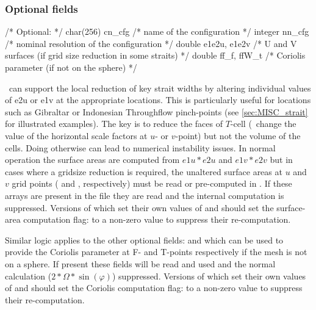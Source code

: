 \documentclass[../main/NEMO_manual]{subfiles}
\begin{document}
\subsubsection{Optional fields}

\begin{forlines}
                        /* Optional:                                                 */
char(256) cn_cfg        /* name of the configuration                                 */
integer   nn_cfg        /* nominal resolution of the configuration                   */
double e1e2u, e1e2v     /* U and V surfaces (if grid size reduction in some straits) */
double ff_f, ffW_t      /* Coriolis parameter (if not on the sphere)                 */
\end{forlines}

\NEMO\ can support the local reduction of key strait widths by
altering individual values of e2u or e1v at the appropriate locations.
This is particularly useful for locations such as Gibraltar or Indonesian Throughflow pinch-points
(see \autoref{sec:MISC_strait} for illustrated examples).
The key is to reduce the faces of $T$-cell
(\ie\ change the value of the horizontal scale factors at $u$- or $v$-point) but
not the volume of the cells.
Doing otherwise can lead to numerical instability issues.
In normal operation the surface areas are computed from $e1u * e2u$ and $e1v * e2v$ but
in cases where a gridsize reduction is required,
the unaltered surface areas at $u$ and $v$ grid points
( and , respectively) must be read or pre-computed in .
If these arrays are present in the  file they are read and
the internal computation is suppressed.
Versions of  which set their own values of  and  should
set the surface-area computation flag:
 to a non-zero value to suppress their re-computation.

\smallskip
Similar logic applies to the other optional fields:
 and  which can be used to
provide the Coriolis parameter at F- and T-points respectively if the mesh is not on a sphere.
If present these fields will be read and used and
the normal calculation ($2 * \Omega * \sin(\varphi)$) suppressed.
Versions of  which set their own values of  and  should
set the Coriolis computation flag:
 to a non-zero value to suppress their re-computation.
\end{document}
